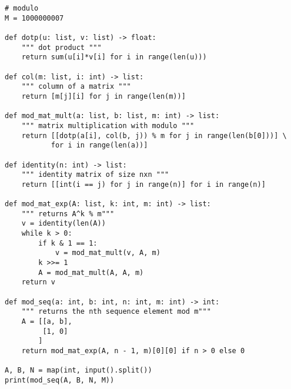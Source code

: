 \documentclass[11pt, oneside]{article}
\begin{document}
\begin{verbatim}
# modulo
M = 1000000007

def dotp(u: list, v: list) -> float:
    """ dot product """
    return sum(u[i]*v[i] for i in range(len(u)))

def col(m: list, i: int) -> list:
    """ column of a matrix """
    return [m[j][i] for j in range(len(m))]

def mod_mat_mult(a: list, b: list, m: int) -> list:
    """ matrix multiplication with modulo """
    return [[dotp(a[i], col(b, j)) % m for j in range(len(b[0]))] \
           for i in range(len(a))]

def identity(n: int) -> list:
    """ identity matrix of size nxn """
    return [[int(i == j) for j in range(n)] for i in range(n)]

def mod_mat_exp(A: list, k: int, m: int) -> list:
    """ returns A^k % m"""
    v = identity(len(A))
    while k > 0:
        if k & 1 == 1:
            v = mod_mat_mult(v, A, m)
        k >>= 1
        A = mod_mat_mult(A, A, m)
    return v

def mod_seq(a: int, b: int, n: int, m: int) -> int:
    """ returns the nth sequence element mod m"""
    A = [[a, b],
         [1, 0]
        ]
    return mod_mat_exp(A, n - 1, m)[0][0] if n > 0 else 0

A, B, N = map(int, input().split())
print(mod_seq(A, B, N, M))
\end{verbatim}
\end{document}
